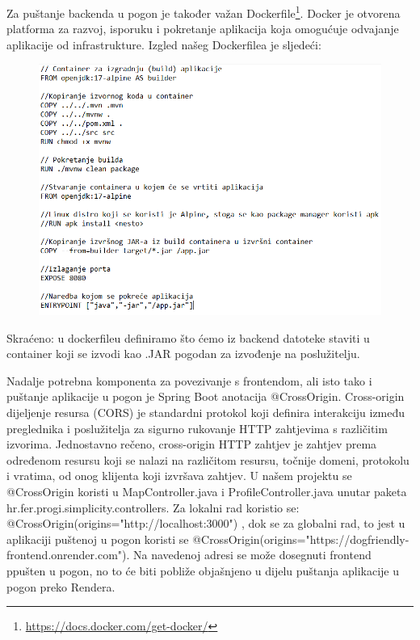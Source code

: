         Za puštanje backenda u pogon je također važan Dockerfile\footnote{\url{https://docs.docker.com/get-docker/}}. Docker je otvorena platforma za razvoj, isporuku i pokretanje aplikacija koja omogućuje odvajanje aplikacije od infrastrukture. Izgled našeg Dockerfilea je sljedeći:
        \begin{figure}[H]
            \includegraphics[width=\textwidth]{slike/kod.png} 
        \end{figure}
        
        
        Skraćeno: u dockerfileu definiramo što ćemo iz backend datoteke staviti u container koji se izvodi kao .JAR pogodan za izvođenje na poslužitelju.

        Nadalje potrebna komponenta za povezivanje s frontendom, ali isto tako i puštanje aplikacije u pogon je Spring Boot anotacija @CrossOrigin. Cross-origin dijeljenje resursa (CORS) je standardni protokol koji definira interakciju između preglednika i poslužitelja za sigurno rukovanje HTTP zahtjevima s različitim izvorima. Jednostavno rečeno, cross-origin HTTP zahtjev je zahtjev prema određenom resursu koji se nalazi na različitom resursu, točnije domeni, protokolu i vratima, od onog klijenta koji izvršava zahtjev. U našem projektu se @CrossOrigin koristi u MapController.java i ProfileController.java unutar paketa hr.fer.progi.simplicity.controllers. Za lokalni rad koristio se: \newline
        @CrossOrigin(origins="http://localhost:3000") , dok se za globalni rad, to jest u aplikaciji puštenoj u pogon koristi se @CrossOrigin(origins="https://dogfriendly-frontend.onrender.com"). Na navedenoj adresi se može dosegnuti frontend ppušten u pogon, no to će biti pobliže objašnjeno u dijelu puštanja aplikacije u pogon preko Rendera.
        
